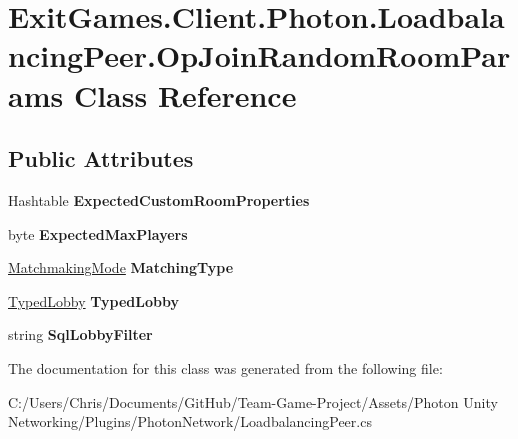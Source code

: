 \hypertarget{class_exit_games_1_1_client_1_1_photon_1_1_loadbalancing_peer_1_1_op_join_random_room_params}{}\section{Exit\+Games.\+Client.\+Photon.\+Loadbalancing\+Peer.\+Op\+Join\+Random\+Room\+Params Class Reference}
\label{class_exit_games_1_1_client_1_1_photon_1_1_loadbalancing_peer_1_1_op_join_random_room_params}
\subsection*{Public Attributes}
\begin{DoxyCompactItemize}
\item 
Hashtable {\bfseries Expected\+Custom\+Room\+Properties}\hypertarget{class_exit_games_1_1_client_1_1_photon_1_1_loadbalancing_peer_1_1_op_join_random_room_params_a5130ad02e0862dcdcca72b839d2cf175}{}\label{class_exit_games_1_1_client_1_1_photon_1_1_loadbalancing_peer_1_1_op_join_random_room_params_a5130ad02e0862dcdcca72b839d2cf175}

\item 
byte {\bfseries Expected\+Max\+Players}\hypertarget{class_exit_games_1_1_client_1_1_photon_1_1_loadbalancing_peer_1_1_op_join_random_room_params_a6b3e4a75d58d92c269f9cf164fb079ee}{}\label{class_exit_games_1_1_client_1_1_photon_1_1_loadbalancing_peer_1_1_op_join_random_room_params_a6b3e4a75d58d92c269f9cf164fb079ee}

\item 
\hyperlink{namespace_exit_games_1_1_client_1_1_photon_aa8150470595f719d6f62ff9467d97c7d}{Matchmaking\+Mode} {\bfseries Matching\+Type}\hypertarget{class_exit_games_1_1_client_1_1_photon_1_1_loadbalancing_peer_1_1_op_join_random_room_params_a5d1b4d00690403a16460162f42642825}{}\label{class_exit_games_1_1_client_1_1_photon_1_1_loadbalancing_peer_1_1_op_join_random_room_params_a5d1b4d00690403a16460162f42642825}

\item 
\hyperlink{class_typed_lobby}{Typed\+Lobby} {\bfseries Typed\+Lobby}\hypertarget{class_exit_games_1_1_client_1_1_photon_1_1_loadbalancing_peer_1_1_op_join_random_room_params_a90a6e9af942cc42535b63a96d52ee5c5}{}\label{class_exit_games_1_1_client_1_1_photon_1_1_loadbalancing_peer_1_1_op_join_random_room_params_a90a6e9af942cc42535b63a96d52ee5c5}

\item 
string {\bfseries Sql\+Lobby\+Filter}\hypertarget{class_exit_games_1_1_client_1_1_photon_1_1_loadbalancing_peer_1_1_op_join_random_room_params_a65e5f6cfe03d2d21335cb72fe2a4f83f}{}\label{class_exit_games_1_1_client_1_1_photon_1_1_loadbalancing_peer_1_1_op_join_random_room_params_a65e5f6cfe03d2d21335cb72fe2a4f83f}

\end{DoxyCompactItemize}


The documentation for this class was generated from the following file\+:\begin{DoxyCompactItemize}
\item 
C\+:/\+Users/\+Chris/\+Documents/\+Git\+Hub/\+Team-\/\+Game-\/\+Project/\+Assets/\+Photon Unity Networking/\+Plugins/\+Photon\+Network/Loadbalancing\+Peer.\+cs\end{DoxyCompactItemize}
